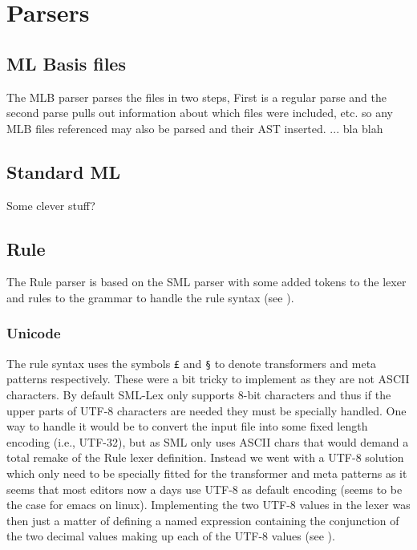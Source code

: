 
\section{Parsers}

\subsection{ML Basis files}

The MLB parser parses the files in two steps, First is a regular parse and the
second parse pulls out information about which files were included, etc. so any
MLB files referenced may also be parsed and their AST inserted.  ... bla blah


\subsection{Standard ML}

Some clever stuff?


\subsection{Rule}

The Rule parser is based on the SML parser with some added tokens to the lexer
and rules to the grammar to handle the rule syntax (see
).

\subsubsection{Unicode}

The rule syntax uses the symbols \texttt{£} and \texttt{§} to denote
transformers and meta patterns respectively. These were a bit tricky to
implement as they are not ASCII characters. By default SML-Lex\cite{ml-lex-yacc}
only supports 8-bit characters and thus if the upper parts of UTF-8 characters
are needed they must be specially handled. One way to handle it would be to
convert the input file into some fixed length encoding (i.e., UTF-32), but as
SML only uses ASCII chars that would demand a total remake of the Rule lexer
definition. Instead we went with a UTF-8 solution which only need to be
specially fitted for the transformer and meta patterns as it seems that most
editors now a days use UTF-8 as default encoding (seems to be the case for emacs
on linux). Implementing the two UTF-8 values in the lexer was then just a matter
of defining a named expression containing the conjunction of the two decimal
values making up each of the UTF-8 values (see ).

